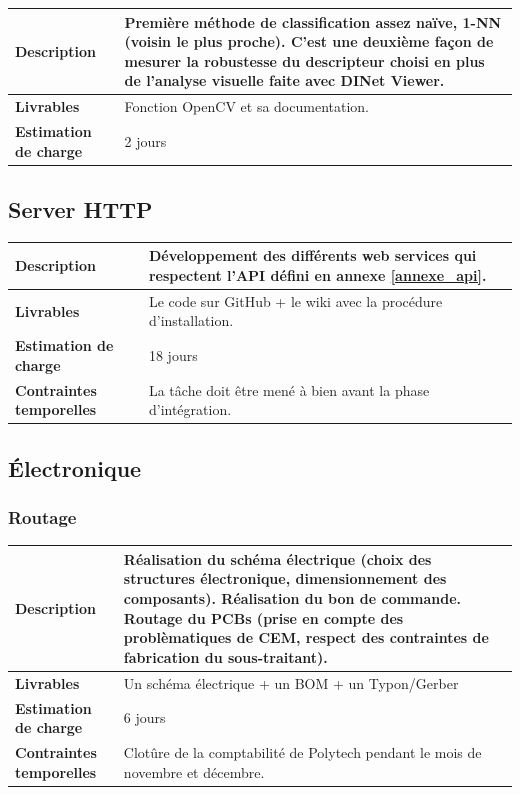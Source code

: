 \begin{tabularx}{13cm}{lX}
    \toprule
        \textbf{Description} &
        Première méthode de classification assez naïve, 1-NN (voisin le plus proche).
        C'est une deuxième façon de mesurer la robustesse du descripteur choisi en plus de l'analyse visuelle faite avec DINet Viewer.
        \\
    \midrule
        \textbf{Livrables} &
        Fonction OpenCV et sa documentation. \\
    \midrule
        \textbf{Estimation de charge} &
        2 jours \\
    \bottomrule
\end{tabularx}


\subsection{Server HTTP}

\begin{tabularx}{13cm}{lX}
    \toprule
        \textbf{Description} &
        Développement des différents web services qui respectent l'API défini en annexe \ref{annexe_api}.  \\
    \midrule
        \textbf{Livrables} &
        Le code sur GitHub + le wiki avec la procédure d'installation. \\
    \midrule
        \textbf{Estimation de charge} &
        18 jours \\
    \midrule
        \textbf{Contraintes temporelles} &
        La tâche doit être mené à bien avant la phase d'intégration. \\
    \bottomrule
\end{tabularx}

\subsection{Électronique}

\subsubsection{Routage}

\begin{tabularx}{13cm}{lX}
    \toprule
        \textbf{Description} &
        Réalisation du schéma électrique (choix des structures électronique, dimensionnement des composants). Réalisation du bon de commande. Routage du PCBs (prise en compte des problèmatiques de CEM, respect des contraintes de fabrication du sous-traitant).  \\
    \midrule
        \textbf{Livrables} &
        Un schéma électrique + un BOM + un Typon/Gerber \\
    \midrule
        \textbf{Estimation de charge} &
        6 jours \\
    \midrule
        \textbf{Contraintes temporelles} &
        Clotûre de la comptabilité de Polytech pendant le mois de novembre et décembre. \\
    \bottomrule
\end{tabularx}


